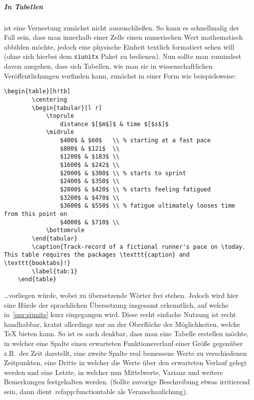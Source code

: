 \subparagraph*{In Tabellen} ist eine Vernestung zunächst nicht auszuschließen. So kann es schnellmalig der Fall sein, dass man innerhalb einer Zelle einen numerischen Wert mathematisch abbilden möchte, jedoch eine physische Einheit textlich formatiert sehen will (ohne sich hierbei dem \texttt{siunitx} Paket zu bedienen). %
Nun sollte man zumindest davon ausgehen, dass sich Tabellen, wie man sie in wissenschaftlichen Veröffentlichungen vorfinden kann, zunächst in einer Form wie beispielsweise: 
\begin{Verbatim}[breaklines=true, breakanywhere=true]
    \begin{table}[h!tb]
        \centering
        \begin{tabular}[l r]
            \toprule
                distance $[$m$]$ & time $[$s$]$
            \midrule
                $400$ & $60$   \\ % starting at a fast pace
                $800$ & $121$  \\
                $1200$ & $183$ \\
                $1600$ & $242$ \\
                $2000$ & $300$ \\ % starts to sprint
                $2400$ & $350$ \\
                $2800$ & $420$ \\ % starts feeling fatigued
                $3200$ & $470$ \\
                $3600$ & $550$ \\ % fatigue ultimately looses time from this point on
                $4000$ & $710$ \\ 
            \bottomrule
        \end{tabular}
        \caption{Track-record of a fictional runner's pace on \today. This table requires the packages \texttt{caption} and \texttt{booktabs}!}
        \label{tab:1}
    \end{table}
\end{Verbatim}
\ldots vorliegen würde, wobei zu übersetzende Wörter frei stehen. Jedoch wird hier eine Hürde der sprachlichen Übersetzung insgesamt erkenntlich, auf welche in~\ref{par:siunits} kurz eingegangen wird. Diese recht einfache Nutzung ist recht handhabbar, kratzt allerdings nur an der Oberfläche der Möglichkeiten, welche \TeX{} bieten kann. 
So ist es auch denkbar, dass man eine Tabelle erstellen möchte, in welcher eine Spalte einen erwarteten Funktionsverlauf einer Größe gegenüber z.B.\ der Zeit darstellt, eine zweite Spalte real bemessene Werte zu verschiedenen Zeitpunkten, eine Dritte in welcher die Werte über den erwarteten Verlauf gelegt werden und eine Letzte, in welcher nun Mittelwerte, Varianz und weitere Bemerkungen festgehalten werden. (Sollte zuvorige Beschreibung etwas irritierend sein, dann dient~ref{app:functiontable} als Veranschaulichung). %


